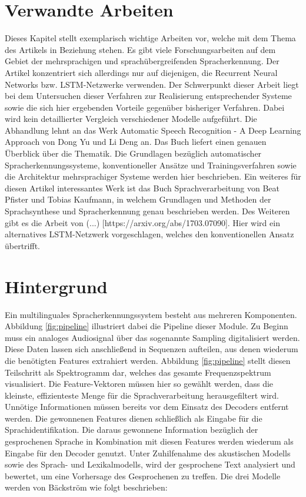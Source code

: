 \section{Verwandte Arbeiten}
Dieses Kapitel stellt exemplarisch wichtige Arbeiten vor, welche mit dem Thema des Artikels in Beziehung stehen. Es gibt viele Forschungsarbeiten auf dem Gebiet der mehrsprachigen und sprachübergreifenden Spracherkennung. Der Artikel konzentriert sich allerdings nur auf diejenigen, die Recurrent Neural Networks bzw. LSTM-Netzwerke verwenden. Der Schwerpunkt dieser Arbeit liegt bei dem Untersuchen dieser Verfahren zur Realisierung entsprechender Systeme sowie die sich hier ergebenden Vorteile gegenüber bisheriger Verfahren. Dabei wird kein detaillierter Vergleich verschiedener Modelle aufgeführt.
Die Abhandlung lehnt an das Werk Automatic Speech Recognition - A Deep Learning Approach von Dong Yu und Li Deng \cite{Yu.2014} an. Das Buch liefert einen genauen Überblick über die Thematik. Die Grundlagen bezüglich automatischer Spracherkennungssysteme, konventioneller Ansätze und Trainingsverfahren sowie die Architektur mehrsprachiger Systeme werden hier beschrieben.
Ein weiteres für diesen Artikel interessantes Werk ist das Buch Sprachverarbeitung von Beat Pfister und Tobias Kaufmann, in welchem Grundlagen und Methoden der Sprachsynthese und Spracherkennung genau beschrieben werden.
Des Weiteren gibt es die Arbeit von (...) [https://arxiv.org/abs/1703.07090]. Hier wird ein alternatives LSTM-Netzwerk vorgeschlagen, welches den konventionellen Ansatz übertrifft.


\section{Hintergrund}
Ein multilinguales Spracherkennungssystem besteht aus mehreren Komponenten. Abbildung \ref{fig:pipeline} illustriert dabei die Pipeline dieser Module. Zu Beginn muss ein analoges Audiosignal über das sogenannte Sampling digitalisiert werden. Diese Daten lassen sich anschließend in Sequenzen aufteilen, aus denen wiederum die benötigten Features extrahiert werden. Abbildung \ref{fig:pipeline} stellt diesen Teilschritt als Spektrogramm dar, welches das gesamte Frequenzspektrum visualisiert. Die Feature-Vektoren müssen hier so gewählt werden, dass die kleinste, effizienteste Menge für die Sprachverarbeitung herausgefiltert wird. Unnötige Informationen müssen bereits vor dem Einsatz des Decoders entfernt werden. Die gewonnenen Features dienen schließlich als Eingabe für die Sprachidentifikation. Die daraus gewonnene Information bezüglich der gesprochenen Sprache in Kombination mit diesen Features werden wiederum als Eingabe für den Decoder genutzt. Unter Zuhilfenahme des akustischen Modells sowie des Sprach- und Lexikalmodells, wird der gesprochene Text analysiert und bewertet, um eine Vorhersage des Gesprochenen zu treffen.
Die drei Modelle werden von Bäckström \cite{Tom.2016} wie folgt beschrieben:

